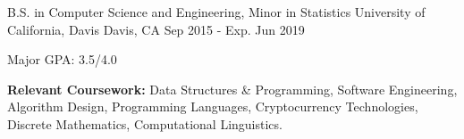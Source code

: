 

\begin{cventries}

  \cventry
    {B.S. in Computer Science and Engineering, Minor in Statistics} %
    {University of California, Davis} %
    {Davis, CA} %
    {Sep 2015 - Exp. Jun 2019} %
    {
      \begin{cvitems} %
        \item {Major GPA: 3.5/4.0}
      \end{cvitems}
    }

\end{cventries}

\begin{cvparagraph}
  \textbf{Relevant Coursework: } Data Structures \& Programming, Software Engineering, Algorithm Design, Programming Languages, Cryptocurrency Technologies, Discrete Mathematics, Computational Linguistics.

\end{cvparagraph}
